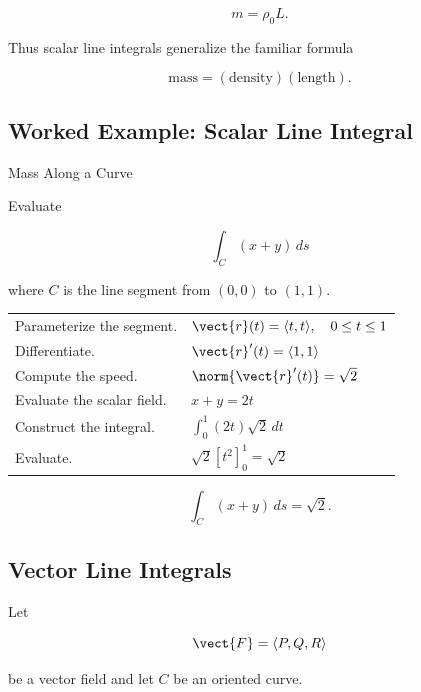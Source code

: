 \[ m=\rho_0L. \]

Thus scalar line integrals generalize the familiar formula

\[ \text{mass}=(\text{density})(\text{length}). \]

\subsection{Worked Example: Scalar Line Integral}
\label{subsec:worked-scalar-line-integral}

\begin{workedexamplebox}{Mass Along a Curve}

Evaluate

\[ \int_C(x+y)\,ds \]

where \(C\) is the line segment from \((0,0)\) to \((1,1)\).

\begin{tabularx}{\textwidth}{@{}>{\raggedright\arraybackslash}p{}X@{}}
Parameterize the segment. &
\(\vect{r}(t)=\langle t,t\rangle,\quad0\leq t\leq1\)\\
Differentiate. &
\(\vect{r}'(t)=\langle1,1\rangle\)\\
Compute the speed. &
\(\norm{\vect{r}'(t)}=\sqrt2\)\\
Evaluate the scalar field. &
\(x+y=2t\)\\
Construct the integral. &
\(\displaystyle \int_0^1(2t)\sqrt2\,dt\)\\
Evaluate. &
\(\displaystyle \sqrt2[t^2]_0^1=\sqrt2\)
\end{tabularx}

\begin{answerbox}
\[ \boxed{\int_C(x+y)\,ds=\sqrt2.} \]
\end{answerbox}
\end{workedexamplebox}

\subsection{Vector Line Integrals}
\label{subsec:vector-line-integrals}

Let

\[ \vect{F}=\langle P,Q,R\rangle \]

be a vector field and let \(C\) be an oriented curve.

